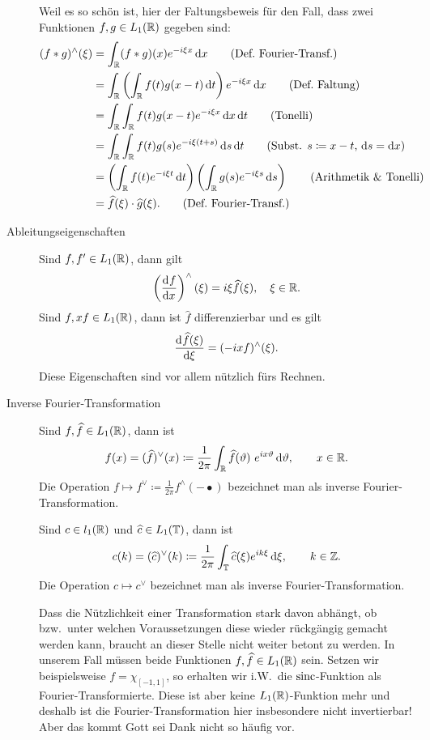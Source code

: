 \begin{remark}
\begin{description}
    Weil es so schön ist, hier der Faltungsbeweis für den Fall, dass zwei Funktionen
    $ f,g \in L_{1}(\mathbb{R}) $ gegeben sind:
    \begin{align}
       (f * g)^{\wedge}(\xi)
    &= \int_{\R} (f * g)(x) e^{-i\xi x} \dif x \tag{Def.\ Fourier-Transf.} \\
    &= \int_{\R} \left( \int_{\R} f(t) g(x - t) \dif t \right) e^{-i\xi x} \dif x 
        \tag{Def.\ Faltung} \\
    &= \int_{\R} \int_{\R} f(t) g(x - t)  e^{-i\xi x} \dif x \dif t
        \tag{Tonelli} \\
     &= \int_{\R} \int_{\R} f(t) g(s)  e^{-i\xi (t + s)} \dif s \dif t
            \tag{Subst. $ s \coloneqq x - t $, $ \dif s = \dif x $} \\
    &= \left( \int_{\R} f(t) e^{-i\xi t} \dif t \right)
       \left( \int_{\R} g(s) e^{-i\xi s} \dif s \right) \tag{Arithmetik \& Tonelli} \\
    &= \widehat{f}(\xi) \cdot \widehat{g}(\xi). \tag{Def.\ Fourier-Transf.}
    \end{align}

		\item [Ableitungseigenschaften] Sind $ f, f' \in L_{1}(\mathbb{R}) $, dann gilt
    \[
      \left( \dod{f}{x} \right)^{\wedge}(\xi) = i\xi \widehat{f}(\xi), \quad \xi \in \R.
    \]
    Sind $ f, xf \in L_{1}(\mathbb{R}) $, dann ist $ \widehat{f} $ differenzierbar und es gilt
    \[
      \dod{\widehat{f}(\xi)}{\xi} = (-ix f)^{\wedge}(\xi).
    \]
    Diese Eigenschaften sind vor allem nützlich fürs Rechnen.
    
		\item [Inverse Fourier-Transformation] Sind $ f, \widehat{f} \in L_{1}(\mathbb{R}) $, dann ist
		\[
  		f(x) = (\widehat{f})^{\vee}(x) \coloneqq 
    		\frac{1}{2\pi} \int_{\R} \widehat{f}(\vartheta) \ e^{i x \vartheta} \dif \vartheta,
    		\qquad x \in \R.
		\]
		Die Operation $ f \mapsto f^{\vee} \coloneqq \frac{1}{2\pi} f^{\wedge}(-\bullet) $ bezeichnet
		man als inverse Fourier-Transformation.
		
		Sind $ c \in l_{1}(\mathbb{R}) $ und $ \widehat{c} \in L_{1}(\mathbb{T}) $, dann ist
		\[
		  c(k) = (\widehat{c})^{\vee}(k) \coloneqq
  		  \frac{1}{2\pi} \int_{\T} \widehat{c}(\xi) e^{ik\xi} \dif \xi,
  		  \qquad k \in \Z.
		\]
		Die Operation $ c \mapsto c^{\vee} $ bezeichnet man als inverse Fourier-Transformation.
		
		Dass die Nützlichkeit einer Transformation stark
		davon abhängt, ob bzw.\ unter welchen Voraussetzungen diese wieder rückgängig gemacht werden 
		kann, braucht an dieser Stelle nicht weiter betont zu werden. In unserem Fall müssen beide
		Funktionen $ f, \widehat{f} \in L_{1}(\mathbb{R}) $ sein. Setzen wir beispielsweise
		$ f = \chi_{[-1,1]} $, so erhalten wir i.W.\ die $ \operatorname{sinc} $-Funktion als Fourier-Transformierte.
		Diese ist aber keine $ L_{1}(\mathbb{R}) $-Funktion mehr und deshalb ist die Fourier-Transformation hier
		insbesondere nicht invertierbar! Aber das kommt Gott sei Dank nicht so häufig vor.
		

\end{description}
\end{remark}
